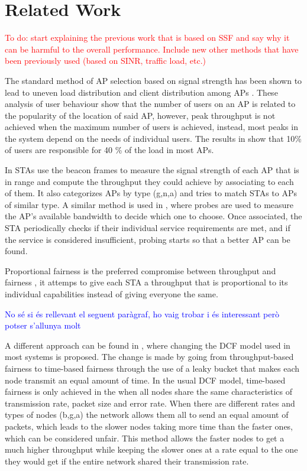 \documentclass{article}
\begin{document}
\section{Related Work}
\label{section:related_work}
	\textcolor{red}{To do: start explaining the previous work that is based on SSF and say why it can be harmful to the overall performance. Include new other methods that have been previously used (based on SINR, traffic load, etc.)}
	
	The standard method of AP selection based on signal strength has been shown to lead to uneven load distribution and client distribution among APs \cite{anand2002, balazinska2003}. These analysis of user behaviour show that the number of users on an AP is related to the popularity of the location of said AP, however, peak throughput is not achieved when the maximum number of users is achieved, instead, most peaks in the system depend on the needs of individual users. The results in \cite{balazinska2003} show that 10\% of users are responsible for 40 \% of the load in most APs. 
	
	In \cite{gong2012} STAs use the beacon frames to measure the signal strength of each AP that is in range and compute the throughput they could achieve by associating to each of them. It also categorizes APs by type (g,n,a) and tries to match STAs to APs of similar type. A similar method is used in \cite{sun2004}, where probes are used to measure the AP's available bandwidth to decide which one to choose. Once associated, the STA periodically checks if their individual service requirements are met, and if the service is considered insufficient, probing starts so that a better AP can be found.
	
	Proportional fairness is the preferred compromise between throughput and fairness \cite{Li2014} \cite{amer2016}, it attemps to give each STA a throughput that is proportional to its individual capabilities instead of giving everyone the same. 
	
		\textcolor{blue}{No sé si és rellevant el seguent paràgraf, ho vaig trobar i és interessant però potser s'allunya molt}
		
	A different approach can be found in \cite{tan2004}, where changing the DCF model used in most systems is proposed. The change is made by going from throughput-based fairness to time-based fairness through the use of a leaky bucket that makes each node transmit an equal amount of time. In the usual DCF model, time-based fairness is only achieved in the  when all nodes share the same characteristics of transmission rate, packet size and error rate. When there are different rates and types of nodes (b,g,a) the network allows them all to send an equal amount of packets, which leads to the slower nodes taking more time than the faster ones, which can be considered unfair. This method allows the faster nodes to get a much higher throughput while keeping the slower ones at a rate equal to the one they would get if the entire network shared their transmission rate.
	
\end{document}
